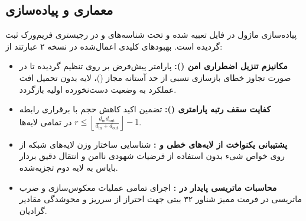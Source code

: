 \subsection{معماری و پیاده‌سازی}
پیاده‌سازی ماژول در فایل  تعبیه شده و تحت شناسه‌های  و  در رجیستری فریم‌ورک ثبت گردیده است. بهبودهای کلیدی اعمال‌شده در نسخه ۲ عبارتند از:
\begin{itemize}
    \item \textbf{مکانیزم تنزیل اضطراری امن ():} پارامتر پیش‌فرض  بر روی  تنظیم گردیده تا در صورت تجاوز خطای بازسازی نسبی از حد آستانه مجاز ()، لایه بدون تحمیل افت عملکرد به وضعیت دست‌نخورده اولیه بازگردد.
    \item \textbf{کفایت سقف رتبه پارامتری ():} تضمین اکید کاهش حجم با برقراری رابطه $r \le \left\lfloor \frac{d_{\text{in}} d_{\text{out}}}{d_{\text{in}} + d_{\text{out}}} \right\rfloor - 1$ در تمامی لایه‌ها.
    \item \textbf{پشتیبانی یکنواخت از لایه‌های خطی و :} شناسایی ساختار وزن لایه‌های شبکه از روی خواص شیء بدون استفاده از فرضیات شهودی ناامن و انتقال دقیق بردار بایاس به لایه دوم تجزیه‌شده.
    \item \textbf{محاسبات ماتریسی پایدار در :} اجرای تمامی عملیات معکوس‌سازی و ضرب ماتریسی در فرمت ممیز شناور ۳۲ بیتی جهت احتراز از سرریز و محوشدگی مقادیر گرادیان.
\end{itemize}
